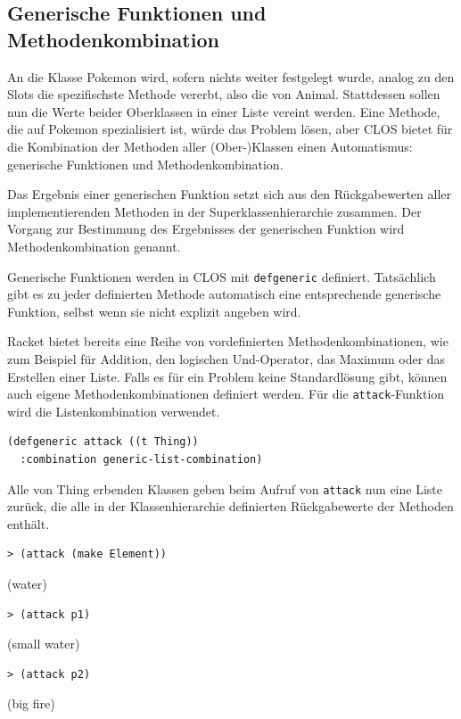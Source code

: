 \subsection{Generische Funktionen und Methodenkombination}
An die Klasse Pokemon wird, sofern nichts weiter festgelegt wurde, analog zu den Slots die spezifischste Methode vererbt, also die von Animal. Stattdessen sollen nun die Werte beider Oberklassen in einer Liste vereint werden. Eine Methode, die auf Pokemon spezialisiert ist, würde das Problem lösen, aber CLOS bietet für die Kombination der Methoden aller (Ober-)Klassen einen Automatismus: generische Funktionen und Methodenkombination. 

Das Ergebnis einer generischen Funktion setzt sich aus den Rückgabewerten aller implementierenden Methoden in der Superklassenhierarchie zusammen. Der Vorgang zur Bestimmung des Ergebnisses der generischen Funktion wird Methodenkombination genannt.

Generische Funktionen werden in CLOS mit \texttt{defgeneric} definiert. Tatsächlich gibt es zu jeder definierten Methode automatisch eine entsprechende generische Funktion, selbst wenn sie nicht explizit angeben wird. 

Racket bietet bereits eine Reihe von vordefinierten Methodenkombinationen, wie zum Beispiel für Addition, den logischen Und-Operator, das Maximum oder das Erstellen einer Liste. Falls es für ein Problem keine Standardlösung gibt, können auch eigene Methodenkombinationen definiert werden. Für die \texttt{attack}-Funktion wird die Listenkombination verwendet.

\begin{lstlisting}
(defgeneric attack ((t Thing))
  :combination generic-list-combination)
\end{lstlisting}

Alle von Thing erbenden Klassen geben beim Aufruf von \texttt{attack} nun eine Liste zurück, die alle in der Klassenhierarchie definierten Rückgabewerte der Methoden enthält.

\begin{lstlisting}
> (attack (make Element))
\end{lstlisting}
{\rsymbol (water)}

\begin{lstlisting}
> (attack p1)
\end{lstlisting}
{\rsymbol (small water)}

\begin{lstlisting}
> (attack p2)
\end{lstlisting}
{\rsymbol (big fire)}

